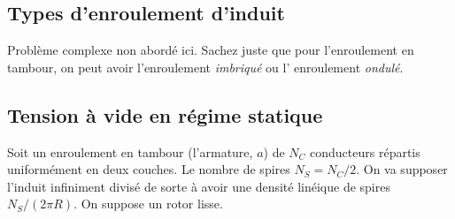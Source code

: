 	\subsection{Types d'enroulement d'induit}
	Problème complexe non abordé ici. Sachez juste que pour l'enroulement 
	en tambour, on peut avoir l'enroulement \textit{imbriqué} ou l'
	enroulement \textit{ondulé}.
	
	\subsection{Tension à vide en régime statique}
	Soit un enroulement en tambour (l'armature, $a$) de $N_C$ conducteurs 
	répartis uniformément en deux couches. Le nombre de spires $N_S=N_C/2$. 
	On va supposer l'induit infiniment divisé de sorte à avoir une densité 
	linéique de spires $N_S/(2\pi R)$. On suppose un rotor lisse.
	
